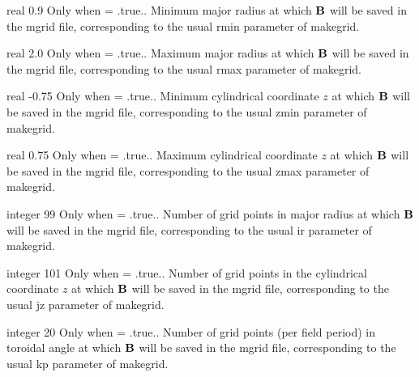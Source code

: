 \myhrule

{real}
{0.9}
{Only when  = {\ttfamily .true.}.}
{Minimum major radius at which ${\mathbf B}$ will be saved in the mgrid file, corresponding to the usual {\ttfamily rmin} parameter of {\ttfamily makegrid}.}

\myhrule

{real}
{2.0}
{Only when  = {\ttfamily .true.}.}
{Maximum major radius at which ${\mathbf B}$ will be saved in the mgrid file, corresponding to the usual {\ttfamily rmax} parameter of {\ttfamily makegrid}.}

\myhrule

{real}
{-0.75}
{Only when  = {\ttfamily .true.}.}
{Minimum cylindrical coordinate $z$ at which ${\mathbf B}$ will be saved in the mgrid file, corresponding to the usual {\ttfamily zmin} parameter of {\ttfamily makegrid}.}

\myhrule

{real}
{0.75}
{Only when  = {\ttfamily .true.}.}
{Maximum cylindrical coordinate $z$ at which ${\mathbf B}$ will be saved in the mgrid file, corresponding to the usual {\ttfamily zmax} parameter of {\ttfamily makegrid}.}

\myhrule

{integer}
{99}
{Only when  = {\ttfamily .true.}.}
{Number of grid points in major radius at which ${\mathbf B}$ will be saved in the mgrid file, corresponding to the usual {\ttfamily ir} parameter of {\ttfamily makegrid}.}

\myhrule

{integer}
{101}
{Only when  = {\ttfamily .true.}.}
{Number of grid points in the cylindrical coordinate $z$ at which ${\mathbf B}$ will be saved in the mgrid file, corresponding to the usual {\ttfamily jz} parameter of {\ttfamily makegrid}.}

\myhrule

{integer}
{20}
{Only when  = {\ttfamily .true.}.}
{Number of grid points (per field period) in toroidal angle at which ${\mathbf B}$ will be saved in the mgrid file, corresponding to the usual {\ttfamily kp} parameter of {\ttfamily makegrid}.}



